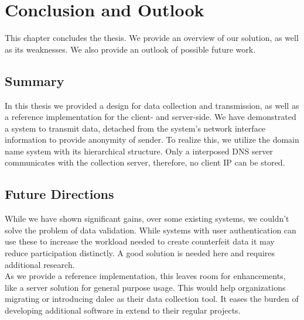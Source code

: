 \chapter{Conclusion and Outlook}
\label{chap:conclusion}
This chapter concludes the thesis. We provide an overview of our solution, as well as its weaknesses.
We also provide an outlook of possible future work. 
\section{Summary}
In this thesis we provided a design for data collection and transmission, as well as a reference implementation for the client- and server-side. We have demonstrated a system to transmit data, detached from the system's network interface information to provide anonymity of sender. 
To realize this, we utilize the domain name system with its hierarchical structure. Only a interposed DNS server communicates with the collection server, therefore, no client IP can be stored.\\


%


\section{Future Directions}

    While we have shown significant gains, over some existing systems, we couldn't solve the problem of data validation. While systems with user authentication can use these to increase the workload needed to create counterfeit data it may reduce participation distinctly.
    A good solution is needed here and requires additional research.\\
    As we provide a reference implementation, this leaves room for enhancements, like a server solution for general purpose usage. This would help organizations migrating or introducing dalec as their data collection tool. It eases the burden of developing additional software in extend 
    to their regular projects.
    
